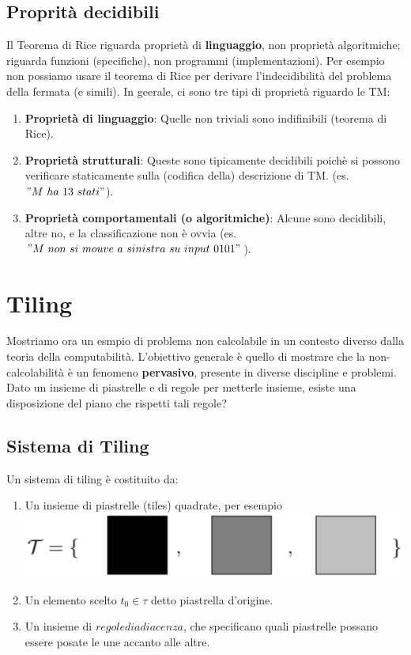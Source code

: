 \documentclass[a4paper, 12pt]{article}
\begin{document}
\subsection{Proprit\`a decidibili}
Il Teorema di Rice riguarda propriet\`a di \textbf{linguaggio}, non propriet\`a algoritmiche; riguarda funzioni (specifiche), non programmi (implementazioni). Per esempio non possiamo usare il teorema di Rice per derivare l'indecidibilit\`a del problema della fermata (e simili).
In geerale, ci sono tre tipi di propriet\`a riguardo le TM:
\begin{enumerate}
\item \textbf{Propriet\`a di linguaggio}: Quelle non triviali sono indifinibili (teorema di Rice).
\item \textbf{Propriet\`a strutturali}: Queste sono tipicamente decidibili poich\`e si possono verificare staticamente sulla (codifica della) descrizione di TM. (es. $"M\ ha\ 13\ stati"$).
\item \textbf{Propriet\`a comportamentali (o algoritmiche)}: Alcune sono decidibili, altre no, e la classificazione non \`e ovvia (es. $"M\ non\ si\ mouve\ a\ sinistra\ su\ input\ 0101"$).
\end{enumerate}
\section{Tiling}
Mostriamo ora un esmpio di problema non calcolabile in un contesto diverso dalla teoria della computabilit\`a. L'obiettivo generale \`e quello di mostrare che la non-calcolabilit\`a \`e un fenomeno \textbf{pervasivo}, presente in diverse discipline e problemi.\\
Dato un insieme di piastrelle e di regole per metterle insieme, esiste una disposizione del piano che rispetti tali regole?
\subsection{Sistema di Tiling}
Un sistema di tiling \`e costituito da:
\begin{enumerate}
\item Un insieme di piastrelle (tiles) quadrate, per esempio\\
\includegraphics[scale=0.5]{tiling1.png}
\item Un elemento scelto $t_0 \in \tau $ detto piastrella d'origine.
\item Un insieme di $regole di adiacenza$, che specificano quali piastrelle possano essere posate le une accanto alle altre.
\end{enumerate}
\end{document}
